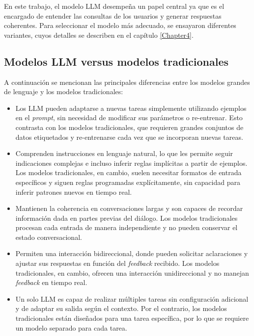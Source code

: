 \vspace{5mm}

En este trabajo, el modelo LLM desempeña un papel central ya que es el encargado de entender las consultas de 
los usuarios y generar respuestas coherentes. Para seleccionar el modelo más adecuado, 
se ensayaron diferentes variantes, cuyos detalles se describen en el capítulo \ref{Chapter4}.

\subsection{Modelos LLM versus modelos tradicionales}

A continuación se mencionan las principales diferencias entre los modelos grandes de lenguaje y los
modelos tradicionales:

\begin{itemize}
	\item Los LLM pueden adaptarse a nuevas tareas simplemente utilizando ejemplos en el \textit{prompt}, 
	sin necesidad de modificar sus parámetros o re-entrenar. Esto contrasta con los modelos tradicionales, 
	que requieren grandes conjuntos de datos etiquetados y re-entrenarse cada vez que se incorporan nuevas tareas.
	\item Comprenden instrucciones en lenguaje natural, lo que les permite seguir indicaciones complejas e 
	incluso inferir reglas implícitas a partir de ejemplos. Los modelos tradicionales, en cambio, suelen necesitar 
	formatos de entrada específicos y siguen reglas programadas explícitamente, sin capacidad para inferir patrones 
	nuevos en tiempo real.
	\item Mantienen la coherencia en conversaciones largas y son capaces de recordar información dada en 
	partes previas del diálogo. Los modelos tradicionales procesan cada entrada de manera independiente y no pueden 
	conservar el estado conversacional.
	\item Permiten una interacción bidireccional, donde pueden solicitar aclaraciones y ajustar sus respuestas 
	en función del \textit{feedback} recibido. Los modelos tradicionales, en cambio, ofrecen una interacción unidireccional
	y no manejan \textit{feedback} en tiempo real.
	\item Un solo LLM es capaz de realizar múltiples tareas sin configuración adicional y de adaptar su salida según 
	el contexto. Por el contrario, los modelos tradicionales están diseñados para una tarea específica, por lo que 
	se requiere un modelo separado para cada tarea.
\end{itemize}

